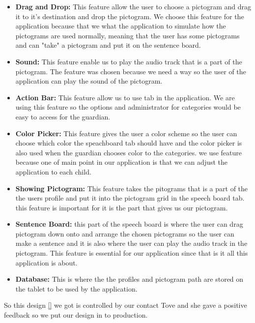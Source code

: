 \begin{itemize}
	\item \textbf{Drag and Drop:} This feature allow the user to choose a pictogram and drag it to it's destination and drop the pictogram.  We choose this feature for the application because that we what the application to simulate how the pictograms are used normally, meaning that the user has some pictograms and can "take" a pictogram and put it on the sentence board.  
	\item \textbf{Sound:} This feature enable us to play the audio track that is a part of the pictogram. The feature was chosen because we need a way so the user of the application can play the sound of the pictogram. 
	\item \textbf{Action Bar:} This feature allow us to use tab in the application. We are using this feature so the options and administrator for categories would be easy to access for the guardian. 
	\item \textbf{Color Picker:} This feature gives the user a color scheme so the user can choose which color the speachboard tab should have and the color picker is also used when the guardian chooses color to the categories. we use feature because one of main point in our application is that we can adjust the application to each child. 
	\item \textbf{Showing Pictogram:} This feature takes the pitograms that is a part of the the users profile and put it into the pictogram grid in the speech board tab. this feature is important for it is the part that gives us our pictogram. 
	\item \textbf{Sentence Board:} this part of the speech board is where the user can drag pictogram down onto and arrange the chosen pictograms so the user can make a sentence and it is also where the user can play the audio track in the pictogram. This feature is essential for our application since that is it all this application is about. 
	\item \textbf{Database:} This is where the the profiles and pictogram path are stored on the tablet to be used by the application.
\end{itemize}

So this design \ref{} we got is controlled by our contact Tove and she gave a positive feedback so we put our design in to production.   